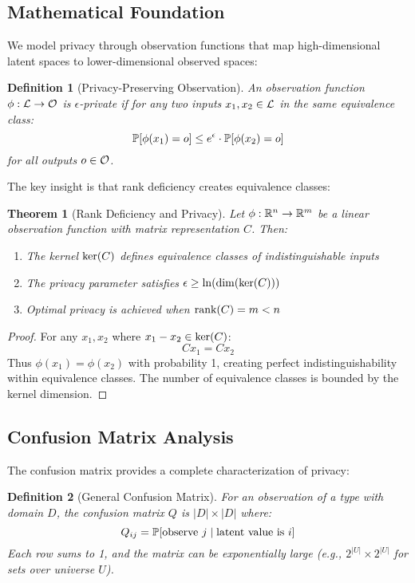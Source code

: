 \documentclass[11pt]{article}
\newtheorem{definition}{Definition}
\newtheorem{theorem}{Theorem}
\begin{document}
\subsection{Mathematical Foundation}

We model privacy through observation functions that map high-dimensional latent spaces to lower-dimensional observed spaces:

\begin{definition}[Privacy-Preserving Observation]
An observation function $\phi: \mathcal{L} \to \mathcal{O}$ is $\epsilon$-private if for any two inputs $x_1, x_2 \in \mathcal{L}$ in the same equivalence class:
$$\mathbb{P}[\phi(x_1) = o] \leq e^{\epsilon} \cdot \mathbb{P}[\phi(x_2) = o]$$
for all outputs $o \in \mathcal{O}$.
\end{definition}

The key insight is that rank deficiency creates equivalence classes:

\begin{theorem}[Rank Deficiency and Privacy]
Let $\phi: \mathbb{R}^n \to \mathbb{R}^m$ be a linear observation function with matrix representation $C$. Then:
\begin{enumerate}
\item The kernel $\text{ker}(C)$ defines equivalence classes of indistinguishable inputs
\item The privacy parameter satisfies $\epsilon \geq \ln(\dim(\text{ker}(C)))$
\item Optimal privacy is achieved when $\text{rank}(C) = m < n$
\end{enumerate}
\end{theorem}

\begin{proof}
For any $x_1, x_2$ where $x_1 - x_2 \in \text{ker}(C)$:
$$C x_1 = C x_2$$
Thus $\phi(x_1) = \phi(x_2)$ with probability 1, creating perfect indistinguishability within equivalence classes. The number of equivalence classes is bounded by the kernel dimension.
\end{proof}

\subsection{Confusion Matrix Analysis}

The confusion matrix provides a complete characterization of privacy:

\begin{definition}[General Confusion Matrix]
For an observation of a type with domain $D$, the confusion matrix $Q$ is $|D| \times |D|$ where:
$$Q_{ij} = \mathbb{P}[\text{observe } j \mid \text{latent value is } i]$$
Each row sums to 1, and the matrix can be exponentially large (e.g., $2^{|U|} \times 2^{|U|}$ for sets over universe $U$).
\end{definition}
\end{document}

